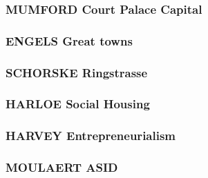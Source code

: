 \documentclass{article}
\begin{document}
\subsubsection{MUMFORD Court Palace Capital}

\subsubsection{ENGELS Great towns}

\subsubsection{SCHORSKE Ringstrasse}

\subsubsection{HARLOE Social Housing}

\subsubsection{HARVEY Entrepreneurialism}

\subsubsection{MOULAERT ASID}



\begin{comment}
\begin{chronology}[10]{1900}{2010}{100ex}[\textwidth]
\event{1930}{Bismarckian (pioneers)}
\event{1960}{Beveridgian (divergence)}
\event{1997}{Convergence}
\end{chronology}
\end{comment}

\printbibliography
\end{document}
